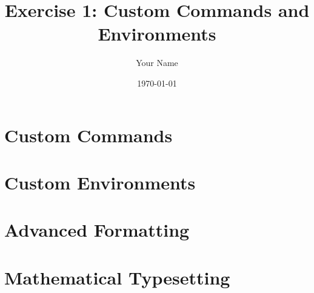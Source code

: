 \documentclass{article}
\title{Exercise 1: Custom Commands and Environments}
\author{Your Name}
\date{\today}
\begin{document}
\maketitle

\section{Custom Commands}

\section{Custom Environments}

\section{Advanced Formatting}

\section{Mathematical Typesetting}
\end{document}
